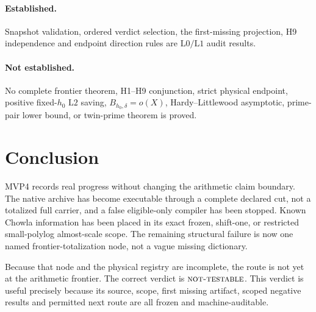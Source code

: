 \documentclass[11pt]{article}
\theoremstyle{definition}
\theoremstyle{remark}
\newcommand{\NT}{\textnormal{\textsc{not-testable}}}
\newcommand{\Lzero}{\mathrm{L0}}
\newcommand{\Lone}{\mathrm{L1}}
\newcommand{\Ltwo}{\mathrm{L2}}
\begin{document}
\paragraph{Established.}
Snapshot validation, ordered verdict selection, the first-missing
projection, H9 independence and endpoint direction rules are
\(\Lzero/\Lone\) audit results.

\paragraph{Not established.}
No complete frontier theorem, H1--H9 conjunction, strict physical
endpoint, positive fixed-\(h_0\) \(\Ltwo\) saving,
\(B_{h_0,\delta}=o(X)\), Hardy--Littlewood asymptotic, prime-pair
lower bound, or twin-prime theorem is proved.

\section{Conclusion}

MVP4 records real progress without changing the arithmetic claim
boundary.  The native archive has become executable through a
complete declared cut, not a totalized full carrier, and a false
eligible-only compiler has been stopped.
Known Chowla information has been placed in its exact frozen,
shift-one, or restricted small-polylog almost-scale scope.  The
remaining structural failure is now one named frontier-totalization
node, not a vague missing dictionary.

Because that node and the physical registry are incomplete, the
route is not yet at the arithmetic frontier.  The correct verdict is
\(\NT\).  This verdict is useful precisely because its source,
scope, first missing artifact, scoped negative results and permitted
next route are all frozen and machine-auditable.

\begingroup
\small
\setlength{\bibsep}{2pt plus 0.3ex}
\sloppy


\endgroup
\end{document}
